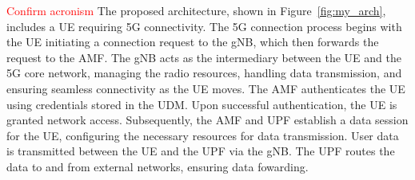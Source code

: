 
\textcolor{red}{Confirm acronism}
The proposed architecture, shown in Figure~\ref{fig:my_arch}, includes a UE requiring 5G connectivity.
The 5G connection process begins with the UE initiating a connection request to the gNB, which then forwards the request to the AMF\@.
The gNB acts as the intermediary between the UE and the 5G core network, managing the radio resources, handling data transmission, and ensuring seamless connectivity as the UE moves.
The AMF authenticates the UE using credentials stored in the UDM. Upon successful authentication, the UE is granted  network access.
Subsequently, the AMF and UPF establish a data session for the UE, configuring the necessary resources for data transmission.
User data is transmitted between the UE and the UPF via the gNB\@.
The UPF routes the data to and from external networks, ensuring data fowarding.



